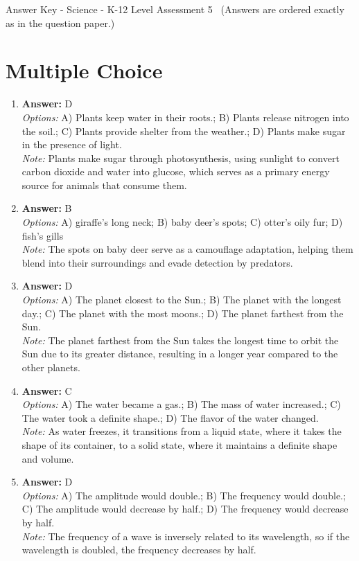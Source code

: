 \documentclass[12pt]{article}
\begin{document}
\begin{center}
Answer Key - Science - K-12 Level Assessment 5 \
\small (Answers are ordered exactly as in the question paper.)
\end{center}

\section*{Multiple Choice}
\begin{enumerate}[label=\arabic*.]
\item \textbf{Answer:} D
\\ \textit{Options:} A) Plants keep water in their roots.; B) Plants release nitrogen into the soil.; C) Plants provide shelter from the weather.; D) Plants make sugar in the presence of light.
\\ \textit{Note:} Plants make sugar through photosynthesis, using sunlight to convert carbon dioxide and water into glucose, which serves as a primary energy source for animals that consume them.
\item \textbf{Answer:} B
\\ \textit{Options:} A) giraffe's long neck; B) baby deer's spots; C) otter's oily fur; D) fish's gills
\\ \textit{Note:} The spots on baby deer serve as a camouflage adaptation, helping them blend into their surroundings and evade detection by predators.
\item \textbf{Answer:} D
\\ \textit{Options:} A) The planet closest to the Sun.; B) The planet with the longest day.; C) The planet with the most moons.; D) The planet farthest from the Sun.
\\ \textit{Note:} The planet farthest from the Sun takes the longest time to orbit the Sun due to its greater distance, resulting in a longer year compared to the other planets.
\item \textbf{Answer:} C
\\ \textit{Options:} A) The water became a gas.; B) The mass of water increased.; C) The water took a definite shape.; D) The flavor of the water changed.
\\ \textit{Note:} As water freezes, it transitions from a liquid state, where it takes the shape of its container, to a solid state, where it maintains a definite shape and volume.
\item \textbf{Answer:} D
\\ \textit{Options:} A) The amplitude would double.; B) The frequency would double.; C) The amplitude would decrease by half.; D) The frequency would decrease by half.
\\ \textit{Note:} The frequency of a wave is inversely related to its wavelength, so if the wavelength is doubled, the frequency decreases by half.
\end{enumerate}
\end{document}
